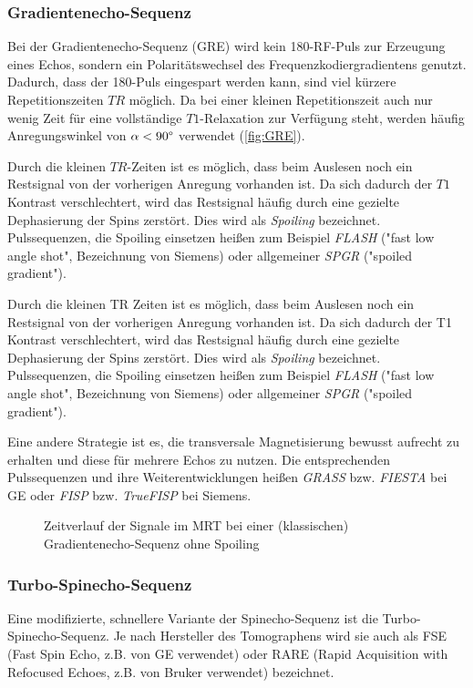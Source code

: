 \subsubsection{Gradientenecho-Sequenz}
Bei der Gradientenecho-Sequenz (GRE) wird kein 180\degree-RF-Puls zur Erzeugung eines Echos, sondern ein Polaritätswechsel des Frequenzkodiergradientens genutzt. Dadurch, dass der 180\degree-Puls eingespart werden kann, sind viel kürzere Repetitionszeiten $TR$ möglich. Da bei einer kleinen Repetitionszeit auch nur wenig Zeit für eine vollständige $T1$-Relaxation zur Verfügung steht, werden häufig Anregungswinkel von $\alpha<90\degree$ verwendet (\autoref{fig:GRE}).

Durch die kleinen $TR$-Zeiten ist es möglich, dass beim Auslesen noch ein Restsignal von der vorherigen Anregung vorhanden ist. Da sich dadurch der $T1$ Kontrast verschlechtert, wird das Restsignal häufig durch eine gezielte Dephasierung der Spins zerstört. Dies wird als \textit{Spoiling} bezeichnet. Pulssequenzen, die Spoiling einsetzen heißen zum Beispiel \textit{FLASH} ("fast low angle shot", Bezeichnung von Siemens) oder allgemeiner \textit{SPGR} ("spoiled gradient").


Durch die kleinen TR Zeiten ist es möglich, dass beim Auslesen noch ein Restsignal von der vorherigen Anregung vorhanden ist. Da sich dadurch der T1 Kontrast verschlechtert, wird das Restsignal häufig durch eine gezielte Dephasierung der Spins zerstört. Dies wird als \textit{Spoiling} bezeichnet. Pulssequenzen, die Spoiling einsetzen heißen zum Beispiel \textit{FLASH} ("fast low angle shot", Bezeichnung von Siemens) oder allgemeiner \textit{SPGR} ("spoiled gradient").

Eine andere Strategie ist es, die transversale Magnetisierung bewusst aufrecht zu erhalten und diese für mehrere Echos zu nutzen. Die entsprechenden Pulssequenzen und ihre Weiterentwicklungen heißen \textit{GRASS} bzw. \textit{FIESTA} bei GE oder \textit{FISP} bzw. \textit{TrueFISP} bei Siemens.

\begin{figure}[H]
	\centering
	\caption[Gradientenecho-Sequenz]{Zeitverlauf der Signale im MRT bei einer (klassischen) Gradientenecho-Sequenz ohne Spoiling}
	\label{fig:GRE}
\end{figure}

\subsubsection{Turbo-Spinecho-Sequenz}
Eine modifizierte, schnellere Variante der Spinecho-Sequenz ist die Turbo-Spinecho-Sequenz. Je nach Hersteller des Tomographens wird sie auch als FSE (Fast Spin Echo, z.B. von GE verwendet) oder RARE (Rapid Acquisition with Refocused Echoes, z.B. von Bruker verwendet) bezeichnet.


